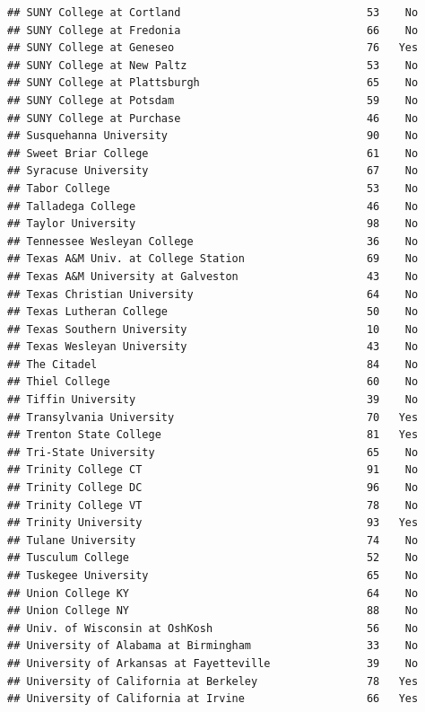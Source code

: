 \documentclass[
]{article}
\begin{document}
\begin{verbatim}
## SUNY College at Cortland                             53    No
## SUNY College at Fredonia                             66    No
## SUNY College at Geneseo                              76   Yes
## SUNY College at New Paltz                            53    No
## SUNY College at Plattsburgh                          65    No
## SUNY College at Potsdam                              59    No
## SUNY College at Purchase                             46    No
## Susquehanna University                               90    No
## Sweet Briar College                                  61    No
## Syracuse University                                  67    No
## Tabor College                                        53    No
## Talladega College                                    46    No
## Taylor University                                    98    No
## Tennessee Wesleyan College                           36    No
## Texas A&M Univ. at College Station                   69    No
## Texas A&M University at Galveston                    43    No
## Texas Christian University                           64    No
## Texas Lutheran College                               50    No
## Texas Southern University                            10    No
## Texas Wesleyan University                            43    No
## The Citadel                                          84    No
## Thiel College                                        60    No
## Tiffin University                                    39    No
## Transylvania University                              70   Yes
## Trenton State College                                81   Yes
## Tri-State University                                 65    No
## Trinity College CT                                   91    No
## Trinity College DC                                   96    No
## Trinity College VT                                   78    No
## Trinity University                                   93   Yes
## Tulane University                                    74    No
## Tusculum College                                     52    No
## Tuskegee University                                  65    No
## Union College KY                                     64    No
## Union College NY                                     88    No
## Univ. of Wisconsin at OshKosh                        56    No
## University of Alabama at Birmingham                  33    No
## University of Arkansas at Fayetteville               39    No
## University of California at Berkeley                 78   Yes
## University of California at Irvine                   66   Yes

\end{verbatim}
\end{document}
